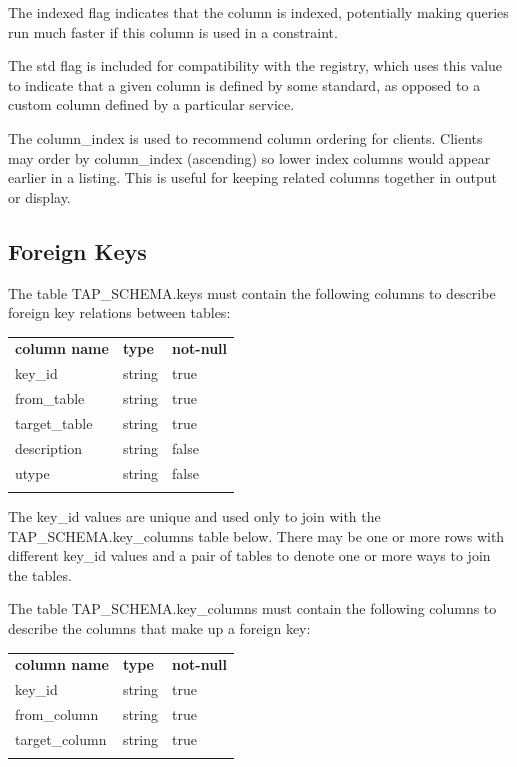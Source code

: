 \documentclass[11pt,letter]{ivoa}
\newcommand{\tapschema}{TAP\_SCHEMA}
\newcommand{\tapschema}{{%
  \relsize{-0.5}TAP\discretionary{-}{}{\kern-2pt\_}SCHEMA}}
\begin{document}
The indexed flag indicates that the column is indexed, potentially 
making queries run much faster if this column is used in a constraint. 

The std flag is included for compatibility with the registry, which uses this value 
to indicate that a given column is defined by some standard, as opposed to a 
custom column defined by a particular service.

The column\_index is used to recommend column ordering for clients. Clients 
may order by column\_index (ascending) so lower index columns would appear 
earlier in a listing. This is useful for keeping related columns together in 
output or display.

\subsection{Foreign Keys}
\label{sec:tap-schema-keys}
The table \tapschema.keys must contain the following columns to 
describe foreign key relations between tables:

\begin{inlinetable}
\begin{tabular}{l l l}
\sptablerule
\textbf{column name} & \textbf{type} & \textbf{not-null} \\
\sptablerule
key\_id & string & true \\
from\_table & string & true \\
target\_table & string & true \\
description & string & false \\
utype & string & false \\
\sptablerule
\end{tabular}
\end{inlinetable}

The key\_id values are unique and used only to join with the 
\tapschema.key\_columns table below. There may be 
one or more rows with different key\_id values and a pair 
of tables to denote one or more ways to join the tables.

The table \tapschema.key\_columns must contain the 
following columns to describe the columns that make up a foreign key:

\begin{inlinetable}
\begin{tabular}{l l l}
\sptablerule
\textbf{column name} & \textbf{type} & \textbf{not-null} \\
\sptablerule
key\_id & string & true \\
from\_column & string & true \\
target\_column & string & true \\
\sptablerule
\end{tabular}
\end{inlinetable}
\end{document}
